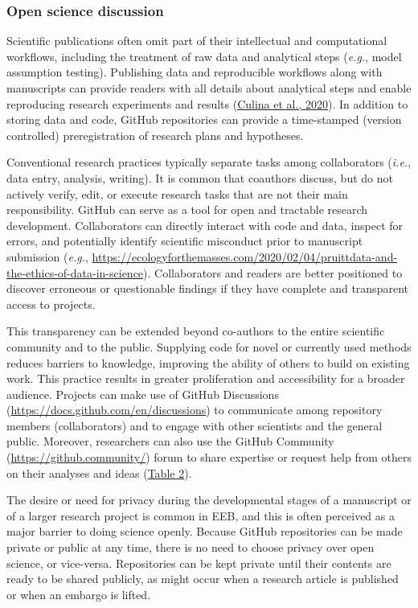 \hypertarget{open-science-discussion}{%
\subsubsection{Open science discussion}\label{open-science-discussion}}

Scientific publications often omit part of their intellectual and computational workflows, including the treatment of raw data and analytical steps (\emph{e.g.}, model assumption testing).
Publishing data and reproducible workflows along with manuscripts can provide readers with all details about analytical steps and enable reproducing research experiments and results (\protect\hyperlink{ref-NOgBWVAr}{Culina et al., 2020}).
In addition to storing data and code, GitHub repositories can provide a time-stamped (version controlled) preregistration of research plans and hypotheses.

Conventional research practices typically separate tasks among collaborators (\emph{i.e.}, data entry, analysis, writing).
It is common that coauthors discuss, but do not actively verify, edit, or execute research tasks that are not their main responsibility.
GitHub can serve as a tool for open and tractable research development.
Collaborators can directly interact with code and data, inspect for errors, and potentially identify scientific misconduct prior to manuscript submission (\emph{e.g.}, \url{https://ecologyforthemasses.com/2020/02/04/pruittdata-and-the-ethics-of-data-in-science}).
Collaborators and readers are better positioned to discover erroneous or questionable findings if they have complete and transparent access to projects.

This transparency can be extended beyond co-authors to the entire scientific community and to the public.
Supplying code for novel or currently used methods reduces barriers to knowledge, improving the ability of others to build on existing work.
This practice results in greater proliferation and accessibility for a broader audience.
Projects can make use of GitHub Discussions (\url{https://docs.github.com/en/discussions}) to communicate among repository members (collaborators) and to engage with other scientists and the general public.
Moreover, researchers can also use the GitHub Community (\url{https://github.community/}) forum to share expertise or request help from others on their analyses and ideas (\protect\hyperlink{tbl:roles}{Table 2}).

The desire or need for privacy during the developmental stages of a manuscript or of a larger research project is common in EEB, and this is often perceived as a major barrier to doing science openly.
Because GitHub repositories can be made private or public at any time, there is no need to choose privacy over open science, or vice-versa.
Repositories can be kept private until their contents are ready to be shared publicly, as might occur when a research article is published or when an embargo is lifted.

